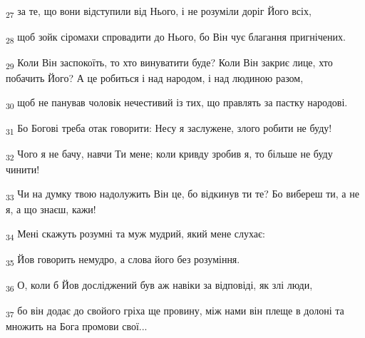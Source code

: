 \begin{tcolorbox}
\textsubscript{27} за те, що вони відступили від Нього, і не розуміли доріг Його всіх,
\end{tcolorbox}
\begin{tcolorbox}
\textsubscript{28} щоб зойк сіромахи спровадити до Нього, бо Він чує благання пригнічених.
\end{tcolorbox}
\begin{tcolorbox}
\textsubscript{29} Коли Він заспокоїть, то хто винуватити буде? Коли Він закриє лице, хто побачить Його? А це робиться і над народом, і над людиною разом,
\end{tcolorbox}
\begin{tcolorbox}
\textsubscript{30} щоб не панував чоловік нечестивий із тих, що правлять за пастку народові.
\end{tcolorbox}
\begin{tcolorbox}
\textsubscript{31} Бо Богові треба отак говорити: Несу я заслужене, злого робити не буду!
\end{tcolorbox}
\begin{tcolorbox}
\textsubscript{32} Чого я не бачу, навчи Ти мене; коли кривду зробив я, то більше не буду чинити!
\end{tcolorbox}
\begin{tcolorbox}
\textsubscript{33} Чи на думку твою надолужить Він це, бо відкинув ти те? Бо вибереш ти, а не я, а що знаєш, кажи!
\end{tcolorbox}
\begin{tcolorbox}
\textsubscript{34} Мені скажуть розумні та муж мудрий, який мене слухає:
\end{tcolorbox}
\begin{tcolorbox}
\textsubscript{35} Йов говорить немудро, а слова його без розуміння.
\end{tcolorbox}
\begin{tcolorbox}
\textsubscript{36} О, коли б Йов досліджений був аж навіки за відповіді, як злі люди,
\end{tcolorbox}
\begin{tcolorbox}
\textsubscript{37} бо він додає до свойого гріха ще провину, між нами він плеще в долоні та множить на Бога промови свої...
\end{tcolorbox}
